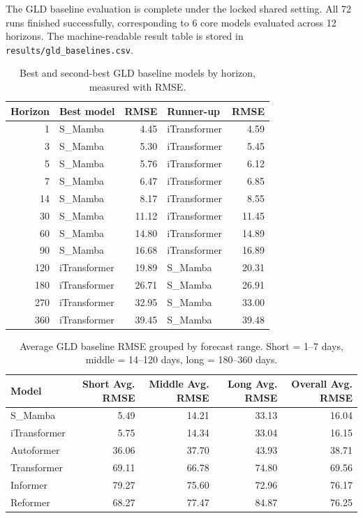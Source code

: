 The GLD baseline evaluation is complete under the locked shared setting.
All 72 runs finished successfully, corresponding to 6 core models evaluated across 12 horizons.
The machine-readable result table is stored in \texttt{results/gld\_baselines.csv}.

\begin{table}[t]
\centering
\caption{Best and second-best GLD baseline models by horizon, measured with RMSE.}
\label{tab:gld-horizon-winners}
\small
\begin{tabular}{r l r l r}
\toprule
Horizon & Best model & RMSE & Runner-up & RMSE \\
\midrule
1 & S\_Mamba & 4.45 & iTransformer & 4.59 \\
3 & S\_Mamba & 5.30 & iTransformer & 5.45 \\
5 & S\_Mamba & 5.76 & iTransformer & 6.12 \\
7 & S\_Mamba & 6.47 & iTransformer & 6.85 \\
14 & S\_Mamba & 8.17 & iTransformer & 8.55 \\
30 & S\_Mamba & 11.12 & iTransformer & 11.45 \\
60 & S\_Mamba & 14.80 & iTransformer & 14.89 \\
90 & S\_Mamba & 16.68 & iTransformer & 16.89 \\
120 & iTransformer & 19.89 & S\_Mamba & 20.31 \\
180 & iTransformer & 26.71 & S\_Mamba & 26.91 \\
270 & iTransformer & 32.95 & S\_Mamba & 33.00 \\
360 & iTransformer & 39.45 & S\_Mamba & 39.48 \\
\bottomrule
\end{tabular}
\end{table}

\begin{table}[t]
\centering
\caption{Average GLD baseline RMSE grouped by forecast range. Short = 1--7 days, middle = 14--120 days, long = 180--360 days.}
\label{tab:gld-term-avg}
\small
\begin{tabular}{lrrrr}
\toprule
Model & Short Avg. RMSE & Middle Avg. RMSE & Long Avg. RMSE & Overall Avg. RMSE \\
\midrule
S\_Mamba & 5.49 & 14.21 & 33.13 & 16.04 \\
iTransformer & 5.75 & 14.34 & 33.04 & 16.15 \\
Autoformer & 36.06 & 37.70 & 43.93 & 38.71 \\
Transformer & 69.11 & 66.78 & 74.80 & 69.56 \\
Informer & 79.27 & 75.60 & 72.96 & 76.17 \\
Reformer & 68.27 & 77.47 & 84.87 & 76.25 \\
\bottomrule
\end{tabular}
\end{table}

